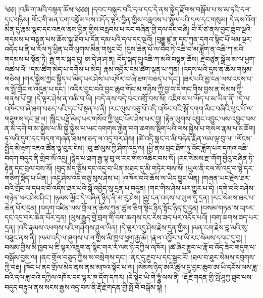 ༄༅། །འཆི་ཀ་མའི་བསྟན་ཆོས།༄༅༅། །དབང་བསྐུར་བའི་དལ་དང་དེ་ནས་སྐྱེད་རྫོགས་བསྒོམ་པ་ས་མ་ཏའི་དལ་དང་གཉིས། གོང་གི་མན་ངག་བསྒོམ་པས་འདོད་ལྷར་བྱིན་གྱིས་བརླབས་པ་སྤྲུལ་པའི་དལ་དང་གསུམ། དེ་ནས་འོག་མིན་དུ་རྣམ་སྣང་དང་འཇལ་ནས་བྱིན་གྱིས་བརླབས་པ་རང་བཞིན་གྱི་དལ་དང་བཞི། བེ་རོ་ཙ་ནས་བྱང་ཆུབ་ལྔའི་གདམས་པ་བསྟན་པས་ཆོས་སྐུ་ཐོབ་པ་དོན་དམ་པའི་དལ་དང་ལྔའོ། །བུདྡྷ་ཛྙ་ན་དང་ཀུན་དགའ་སྙིང་པོ་ལམ་ལྔར་འདོད་པ་ནི་ཕ་རོལ་ཏུ་ཕྱིན་པའི་ལུགས་མིན་གསུང་ངོ། །དུས་ཆེན་པོ་ལ་བབ་ཏེ་འཆི་བ་མ་ཟློག་ན་འཆི་ཀ་མའི་གདམས་པ་སྟོན་ཏེ། རྒྱ་གར་སྐད་དུ། ཨ་དེ་ཤ་ཤ་ན། བོད་སྐད་དུ།འཆི་ཀ་མའི་བསྟན་ཆོས། རྗེ་བཙུན་སྒྲོལ་མ་ལ་ཕྱག་འཚལ་ལོ། །དམ་ཚིག་མེད་པ་དགོས་པ་མེད། རྣམ་འབྱོར་དམ་ཚིག་ལྡན་པ་ཀུན། །འདས་པའི་དུས་ན་ཆོས་གསུམ་གཅེས། །གར་སྐྱེས་ཀྱང་སྐྱིད་པ་མེད་པར་ཤེས་པ་འཁོར་བ་ཞེ་ཐག་བཅད་པ་དང་། །ཐར་པའི་མྱ་ངན་ལས་འདས་པ་ལ་སྤྲོ་གྲོང་ལ་འདུན་པ་དང་། །འདིར་བྱང་བའི་བྱང་ཆུབ་གོང་མ་གཉིས་ཀྱི་བྱ་བ་དེ་གང་གིས་བྱས་ན་སེམས་ཀྱི་གནས་པོ་བྱ། །དེ་ལྟར་ཤེས་ན་འཆི་བ་ཡི། །བདེ་ནས་བདེ་བར་འགྲོ་བས་སོ། འཇིགས་པ་ཡོད་པ་མ་ཡིན་ནོ། །དེ་ལ་འཁོར་བ་ཞེ་ཐག་བཅད་པའི་དང་པོ་སྟན་པ་ནི། །རང་ལུས་བཅུ་པོ་འདི་འཁོར་བའི་སྒོ་དགག་མིང་བཞིའི་ཕུང་པོ་ལ་གཟུགས་དང་ལྔ་ལ། །སྙིང་པཌྷོ་མེད་པར་གསོབ་ཀྱི་ཕུང་པོར་ཤེས་པར་བྱ། །རྟེན་ལུགས་འབྱུང་འབྱུང་ལས་འབྱུང་བས་ན་མི་དགེ་བ་མ་སྐྱེས་པ་མི་སྐྱེ་སྐྱེས་པ་ཡང་འགགས་རྐྱེན་བག་ཆགས་སྡིག་པའི་ལས་སྐྱེས་པ་གསལ་རྣམ་པ་མཆོག།ཧ་ལའི་དུག་དང་བདག་གཞན་ཐམས་ཅད་ལ་འདྲ་བར་ཤེས། །ཚེ་འདི་སྣང་བ་མི་བདེན་རྨིན་ལམ་ལྟ་བུ་ལ། །ལོངས་སྤྱོད་མི་རྟག་འཇའ་ཚོན་ལྟ་བུར་ངེས། །བུ་ཚ་ལུས་ཀྱི་ཤིག་འདྲ་ལ། །ཕྱི་ནས་བྲང་ཐོག་ཏུ་འོང་ཟློག་པར་དཀའ་འཆི་བདག་བདུད་ནི་གྲིབ་སོ་འདྲ། །རྙེད་པ་ཐག་རྒྱ་ལྟ་བུ་ལ་རང་གིས་འཆིང་བས་སོ། །རང་སེམས་རྫ་གོག་བྱེའུ་བཞིན་ཏེ་རྟེན་དང་བྲལ་བས་སོ། །བུད་མེད་སྔོས་དང་འདྲ་བ་ཡིན་མཐར་དུ་མི་གཏེར་བས་སོ། །ཡུལ་ནི་ངལ་སོ་འདྲ་བ་སྟེ་དར་གཅིག་སྡོད་པ་ཡིན། །འདུ་ཤེས་འདི་བཅུ་སུས་ཤེས་པ། །འཁོར་བའི་ཆོས་ལ་ཡིད་བྱུང་ཡིན། །གཞན་ཡང་རྗེས་ཐར་བའི་གྲོང་ལ་དཔའ་བོ་འདིས་ཐར་པའི་སྒོ་འབྱེད་སུ་དྲན་པ་བདུན། །གང་གིས་ཤེས་པར་གྱུར་པ་དེ། །དགེ་བའི་བཤེས་གཉེན་ཕར་ཤེས་ཤིང་། །ཉམས་མྱོང་དེ་བཞིན་ཉིད་ནི་མ་རུ་ཤེས། །མྱ་ངན་འདས་པ་ཡུལ་དུ་དྲན། །རང་སེམས་ཐར་པ་ཆེན་པོར་དྲན། །བདག་འཛིན་ལས་གྲོལ་ན་ཆོས་ཀུན་ཚུལ་ཅིག་སྟོང་ཉིད་སྟོང་ཉིད་དུ་དྲན། །བསམ་གཏན་ས་འཁར་དང་འདྲ་བར་ཆེན་པོར་དྲན། །ལུས་རྒྱུད་བྱེ་བྲག་གི་བག་ཆགས་དང་རེས་ཟད་པར་འདོད་པའོ། །བག་ཆགས་ཟད་པར་དྲན། །འདི་རྣམས་འཕགས་པའི་གཤེགས་ཤུལ་ཡིན། །དེ་ལྟར་འདུ་ཤེས་རྗེས་དྲན་གྱིས། །མན་ངག་རྗེས་བླ་མའི་སུ་བཟུང་ནས་ནི། །ལམ་འདི་ལ་ཞུགས་པ་ལ་གྱིས་མི་ཁྱབ་ཕྱག་རྒྱ་ཆེ། །རྣལ་འབྱོར་པ་ཡི་རང་སེམས་དབང་དུ་བྱ། །བསམ་གྱིས་མི་ཁྱབ་པ་ཇི་ལྟར་འཇུག་ན་སྙིང་གར་རཾ་ལས་ཉི་དཀྱིལ་འཁོར། །ཚ་ཞིང་རྩུབ་པ་རྣོ་བ་འོད་ཟེར་གདུག་པ་བསྒོམ་བྱས་ལ། །ནང་གྲོལ་བཅུད་ཀྱིས་ས་བསྲེགས་དང་། །ནང་དུ་རྔུབ་པ་དང་སྦྱར་རོ། །ཐལ་བ་ཐུར་སེམས་དབུགས་ཀྱི་བརྡ། །ཁོང་པ་ནང་གྲོལ་མེད་ནས་ནམ་མཁའ་སྟོང་པ་ལ། །སེམས་ཉིད་ཨའི་ཚུལ་དུ་བྱང་ཆུབ་ཨ་ཡི་དངོས་ལས་ཟླ་བའི་དལ་ཟླ་བའི་དཀྱིལ་འཁོར་དང་ལྟར་ཁ་དོག་དཀར། །དེ་སྟེང་ཡི་གེ་ཧཱུཾ་ལས་ནི། །རྡོ་རྗེ་གདན་གྱི་སྤོ་ཤཱཀྱ་ཐུབ་པས་བདུད་བརྟུལ་ནས་སངས་རྒྱས་འདྲ་བས་ནི་རྡོ་རྗེ་གདན་གྱི་སྤོ་བོ་བསྒོམ་སྟེ། །

